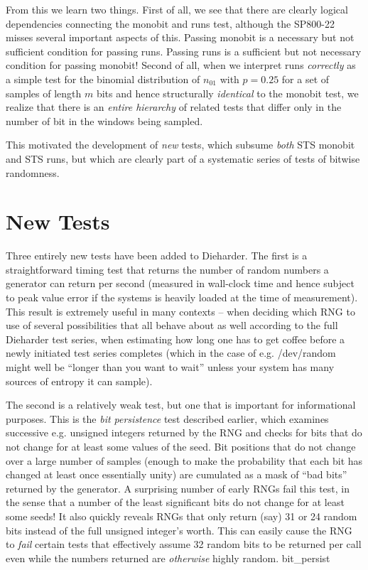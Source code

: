 \documentclass[12pt]{book}
\begin{document}
From this we learn two things.  First of all, we see that there are
clearly logical dependencies connecting the monobit and runs test,
although the SP800-22 misses several important aspects of this.  Passing
monobit is a necessary but not sufficient condition for passing runs.
Passing runs is a sufficient but not necessary condition for passing
monobit!  Second of all, when we interpret runs {\em correctly} as a
simple test for the binomial distribution of $n_{01}$ with $p = 0.25$
for a set of samples of length $m$ bits and hence structurally {\em
identical} to the monobit test, we realize that there is an {\em entire
hierarchy} of related tests that differ only in the number of bit in the
windows being sampled.

This motivated the development of {\em new} tests, which subsume {\em
both} STS monobit and STS runs, but which are clearly part of a
systematic series of tests of bitwise randomness.

\section{New Tests}

Three entirely new tests have been added to Dieharder.  The first is a
straightforward timing test that returns the number of random numbers a
generator can return per second (measured in wall-clock time and hence
subject to peak value error if the systems is heavily loaded at the time
of measurement).  This result is extremely useful in many contexts --
when deciding which RNG to use of several possibilities that all behave
about as well according to the full Dieharder test series, when
estimating how long one has to get coffee before a newly initiated test
series completes (which in the case of e.g. /dev/random might well be
``longer than you want to wait'' unless your system has many sources of
entropy it can sample).

The second is a relatively weak test, but one that is important for
informational purposes.  This is the {\em bit persistence} test
described earlier, which examines successive e.g. unsigned integers
returned by the RNG and checks for bits that do not change for at least
some values of the seed.  Bit positions that do not change over a large
number of samples (enough to make the probability that each bit has
changed at least once essentially unity) are cumulated as a mask of
``bad bits'' returned by the generator.  A surprising number of early
RNGs fail this test, in the sense that a number of the least significant
bits do not change for at least some seeds!  It also quickly reveals
RNGs that only return (say) 31 or 24 random bits instead of the full
unsigned integer's worth.  This can easily cause the RNG to {\em fail}
certain tests that effectively assume 32 random bits to be returned per
call even while the numbers returned are {\em otherwise} highly random.
bit\_persist
\end{document}
